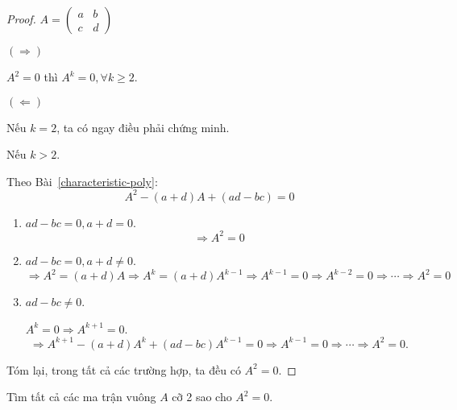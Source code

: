 \documentclass[class=nhvh-linear-algebra,crop=false]{standalone}
\begin{document}
\begin{proof}
    $A = \begin{pmatrix}a & b \\ c & d\end{pmatrix}$
    \par $(\Rightarrow)$
    \par $A^{2} = 0$ thì $A^{k} = 0,\forall k\ge 2$.
    \par $(\Leftarrow)$
    \par Nếu $k = 2$, ta có ngay điều phải chứng minh.
    \par Nếu $k > 2$.
    \par Theo Bài~\ref{characteristic-poly}:
    \[
        A^{2} - (a+d)A + (ad - bc) = 0
    \]
    \begin{enumerate}[label = Trường hợp \arabic*:,itemindent=2cm]
        \item $ad - bc = 0, a + d = 0$.
              \[
                  \Rightarrow A^{2} = 0
              \]
        \item $ad - bc = 0, a + d \ne 0$.
              \[
                  \Rightarrow A^{2} = (a+d)A \Rightarrow A^{k} = (a+d)A^{k-1} \Rightarrow A^{k-1} = 0\Rightarrow A^{k-2} = 0 \Rightarrow \cdots \Rightarrow A^{2} = 0
              \]
        \item $ad - bc \ne 0$.
              \par $A^{k} = 0\Rightarrow A^{k+1} = 0$.
              \[
                  \Rightarrow A^{k+1} - (a+d)A^{k} + (ad-bc)A^{k-1} = 0 \Rightarrow A^{k-1} = 0 \Rightarrow \cdots \Rightarrow A^{2} = 0.
              \]
    \end{enumerate}
    \par Tóm lại, trong tất cả các trường hợp, ta đều có $A^{2} = 0$.
\end{proof}

\begin{exercise}
    Tìm tất cả các ma trận vuông $A$ cỡ 2 sao cho $A^{2} = 0$.
\end{exercise}
\end{document}
